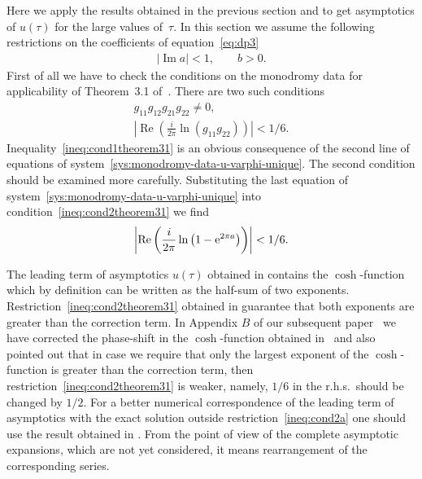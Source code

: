\documentclass[pdftex]{sigma}
\numberwithin{equation}{section}
\begin{document}
Here we apply the results obtained in the previous section and \cite{KV2004} to get asymptotics of $u(\tau)$ for
the large values of~$\tau$. In this section we assume the following restrictions on the coefficients of equation~\eqref{eq:dp3}
\begin{gather*}
|\operatorname{Im}a|<1,\qquad b>0.
\end{gather*}
First of all we have to check the conditions on the monodromy data for applicability of Theorem~3.1 of~\cite{KV2004}.
There are two such conditions
\begin{gather}
g_{11}g_{12}g_{21}g_{22}\neq0,\label{ineq:cond1theorem31}\\
\left|\operatorname{Re}\left(\frac{i}{2\pi}\ln(g_{11}g_{22})\right)\right|<1/6.\label{ineq:cond2theorem31}
\end{gather}
Inequality~\eqref{ineq:cond1theorem31} is an obvious consequence of the second line of equations
of system~\eqref{sys:monodromy-data-u-varphi-unique}. The second condition should be examined more carefully.
Substituting the last equation of system~\eqref{sys:monodromy-data-u-varphi-unique} into
condition~\eqref{ineq:cond2theorem31} we find
\begin{gather}\label{ineq:cond2a}
\left|\operatorname{Re}\left(\frac{i}{2\pi}\ln\big(1-{\rm e}^{2\pi a}\big)\right)\right|<1/6.
\end{gather}
\begin{Remark}\label{rem:weaker-condition}
The leading term of asymptotics $u(\tau)$ obtained in \cite{KV2004} contains the $\cosh$-function which by
definition can be written as the half-sum of two exponents. Restriction~\eqref{ineq:cond2theorem31} obtained
in \cite{KV2004} guarantee that both exponents are greater than the correction term. In Appendix $B$ of our
subsequent paper~\cite{KV2010} we have corrected the phase-shift in the $\cosh$-function obtained in~\cite{KV2004}
and also pointed out that in case we require that only the largest exponent of the $\cosh$-function is greater than
the correction term, then restriction~\eqref{ineq:cond2theorem31} is weaker, namely, $1/6$ in the r.h.s.\ should be
changed by $1/2$. For a better numerical correspondence of the leading term of asymptotics with the exact solution
outside restriction~\eqref{ineq:cond2a} one should use the result obtained in \cite{KV2010}.
From the point of view of the complete asymptotic expansions, which are not yet considered, it means
rearrangement of the corresponding series.
\end{Remark}
\end{document}
